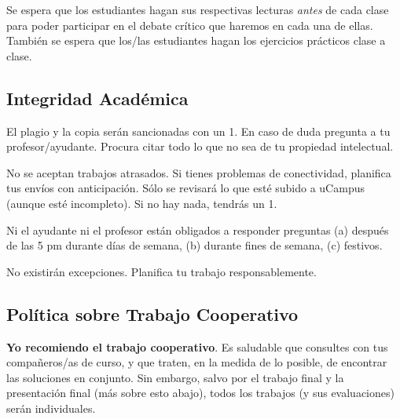 \documentclass[letterpaper]{article}
\renewenvironment{itemize}{
  \begin{list}{}{
    \setlength{\leftmargin}{1.5em}
  }
}{
  \end{list}
}
\begin{document}
\begin{itemize}
    \item[{\color{red}\Pointinghand}] Se espera que los estudiantes hagan sus respectivas lecturas \emph{antes} de cada clase para poder participar en el debate cr\'itico que haremos en cada una de ellas. Tambi\'en se espera que los/las estudiantes hagan los ejercicios pr\'acticos clase a clase.
\end{itemize}





\subsection*{Integridad Acad\'emica}


\begin{itemize}
	\item[$\circ$] El plagio y la copia ser\'an sancionadas con un 1. En caso de duda pregunta a tu profesor/ayudante. Procura citar todo lo que no sea de tu propiedad intelectual.
	\item[$\circ$] No se aceptan trabajos atrasados. Si tienes problemas de conectividad, planifica tus env\'ios con anticipaci\'on. S\'olo se revisar\'a lo que est\'e subido a uCampus (aunque est\'e incompleto). Si no hay nada, tendr\'as un 1.
	\item[$\circ$] Ni el ayudante ni el profesor est\'an obligados a responder preguntas (a) despu\'es de las 5 pm durante d\'ias de semana, (b) durante fines de semana, (c) festivos.
\end{itemize}

\begin{itemize}
\item[{\color{red}\Pointinghand}] No existir\'an excepciones. Planifica tu trabajo responsablemente. 
\end{itemize}

\subsection*{Pol\'itica sobre Trabajo Cooperativo}

{\bf Yo recomiendo el trabajo cooperativo}. Es saludable que consultes con tus compa\~neros/as de curso, y que traten, en la medida de lo posible, de encontrar las soluciones en conjunto. Sin embargo, salvo por el trabajo final y la presentaci\'on final (m\'as sobre esto abajo), todos los trabajos (y sus evaluaciones) ser\'an individuales.
\end{document}
